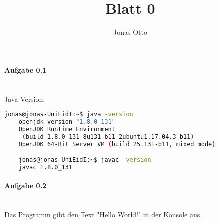 \documentclass{article}
\newcommand{\newlineparagraph}[1]{\paragraph{#1}\mbox{}\\}
\begin{document}
\title{Blatt 0}
\author{Jonas Otto}
\maketitle

\newlineparagraph{Aufgabe 0.1}
  Java Version:
  \begin{lstlisting}[language=bash]
    jonas@jonas-UniEidI:~$ java -version
    openjdk version "1.8.0_131"
    OpenJDK Runtime Environment
     (build 1.8.0_131-8u131-b11-2ubuntu1.17.04.3-b11)
    OpenJDK 64-Bit Server VM (build 25.131-b11, mixed mode)

    jonas@jonas-UniEidI:~$ javac -version
    javac 1.8.0_131
  \end{lstlisting}

\newlineparagraph{Aufgabe 0.2}
Das Programm gibt den Text "Hello World!" in der Konsole aus.
\end{document}
